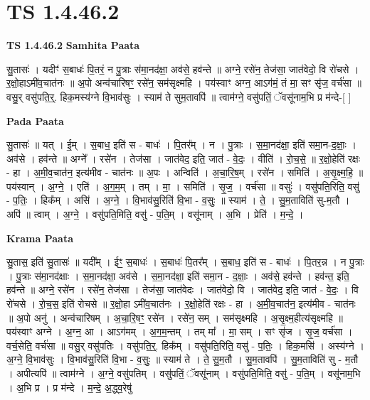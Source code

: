 \documentclass[17pt]{extarticle}
\begin{document}
\section{ TS 1.4.46.2 }

\textbf{TS 1.4.46.2 } \newline
\textbf{Samhita Paata} \newline

सु॒तासः॑ । यदीꣳ॑ स॒बाधः॑ पि॒तरं॒ न पु॒त्राः स॑मा॒नद॑क्षा॒ अव॑से॒ हव॑न्ते ॥ अग्ने॒ रसे॑न॒ तेज॑सा॒ जात॑वेदो॒ वि रो॑चसे । र॒क्षो॒हाऽमी॑व॒चात॑नः ॥ अ॒पो अन्व॑चारिषꣳ॒॒ रसे॑न॒ सम॑सृक्ष्महि । पय॑स्वाꣳ अग्न॒ आऽग॑मं॒ तं मा॒ सꣳ सृ॑ज॒ वर्च॑सा ॥वसु॒र् वसु॑पति॒र्॒. हिक॒मस्य॑ग्ने वि॒भाव॑सुः । स्याम॑ ते सुम॒तावपि॑ ॥ त्वाम॑ग्ने॒ वसु॑पतिं॒ ॅवसू॑नाम॒भि प्र म॑न्दे-[ ] \newline

\textbf{Pada Paata} \newline

सु॒तासः॑ ॥ यत् । ई॒म् । स॒बाध॒ इति॑ स - बाधः॑ । पि॒तर᳚म् । न । पु॒त्राः । स॒मा॒नद॑क्षा॒ इति॑ समा॒न-द॒क्षाः॒ । अव॑से । हव॑न्ते ॥ अग्ने᳚ । रसे॑न । तेज॑सा । जात॑वेद॒ इति॒ जात॑ - वे॒दः॒ । वीति॑ । रो॒च॒से॒ ॥ र॒क्षो॒हेति॑ रक्षः - हा । अ॒मी॒व॒चात॑न॒ इत्य॑मीव - चात॑नः ॥ अ॒पः । अन्विति॑ । अ॒चा॒रि॒ष॒म् । रसे॑न । समिति॑ । अ॒सृ॒क्ष्म॒हि॒ ॥ पय॑स्वान् । अ॒ग्ने॒ । एति॑ । अ॒ग॒म॒म् । तम् । मा॒ । समिति॑ । सृ॒ज॒ । वर्च॑सा ॥ वसुः॑ । वसु॑पति॒रिति॒ वसु॑ - प॒तिः॒ । हिक᳚म् । असि॑ । अ॒ग्ने॒ । वि॒भाव॑सु॒रिति॑ वि॒भा - व॒सुः॒ ॥ स्याम॑ । ते॒ । सु॒म॒ताविति॑ सु-म॒तौ । अपि॑ ॥ त्वाम् । अ॒ग्ने॒ । वसु॑पति॒मिति॒ वसु॑ - प॒ति॒म् । वसू॑नाम् । अ॒भि । प्रेति॑ । म॒न्दे॒ ।  \newline


\textbf{Krama Paata} \newline

सु॒तास॒ इति॑ सु॒तासः॑ ॥ यदी᳚म् । ईꣳ॒॒ स॒बाधः॑ । स॒बाधः॑ पि॒तर᳚म् । स॒बाध॒ इति॑ स - बाधः॑ । पि॒तर॒न्न । न पु॒त्राः । पु॒त्राः स॑मा॒नद॑क्षाः । स॒मा॒नद॑क्षा॒ अव॑से । स॒मा॒नद॑क्षा॒ इति॑ समा॒न - द॒क्षाः॒ । अव॑से॒ हव॑न्ते । हव॑न्त॒ इति॒ हव॑न्ते ॥ अग्ने॒ रसे॑न । रसे॑न॒ तेज॑सा । तेज॑सा॒ जात॑वेदः । जात॑वेदो॒ वि । जात॑वेद॒ इति॒ जात॑ - वे॒दः॒ । वि रो॑चसे । रो॒च॒स॒ इति॑ रोचसे ॥ र॒क्षो॒हा ऽमी॑व॒चात॑नः । र॒क्षो॒हेति॑ रक्षः - हा । अ॒मी॒व॒चात॑न॒ इत्य॑मीव - चात॑नः ॥ अ॒पो अनु॑ । अन्व॑चारिषम् । अ॒चा॒रि॒षꣳ॒॒ रसे॑न । रसे॑न॒ सम् । सम॑सृक्ष्महि । अ॒सृ॒क्ष्म॒हीत्य॑सृक्ष्महि ॥ पय॑स्वाꣳ अग्ने । अ॒ग्न॒ आ । आऽग॑मम् । अ॒ग॒म॒न्तम् । तम् मा᳚ । मा॒ सम् । सꣳ सृ॑ज । सृ॒ज॒ वर्च॑सा । वर्च॒सेति॒ वर्च॑सा ॥ वसु॒र् वसु॑पतिः । वसु॑पति॒र्॒. हिक᳚म् । वसु॑पति॒रिति॒ वसु॑ - प॒तिः॒ । हिक॒मसि॑ । अस्य॑ग्ने । अ॒ग्ने॒ वि॒भाव॑सुः । वि॒भाव॑सु॒रिति॑ वि॒भा - व॒सुः॒ ॥ स्याम॑ ते । ते॒ सु॒म॒तौ । सु॒म॒तावपि॑ । सु॒म॒ताविति॑ सु - म॒तौ । अपीत्यपि॑ ॥ त्वाम॑ग्ने । अ॒ग्ने॒ वसु॑पतिम् । वसु॑पतिं॒ ॅवसू॑नाम् । वसु॑पति॒मिति॒ वसु॑ - प॒ति॒म् । वसू॑नाम॒भि । अ॒भि प्र । प्र म॑न्दे । म॒न्दे॒ अ॒द्ध्व॒रेषु॑ \newline
\end{document}
